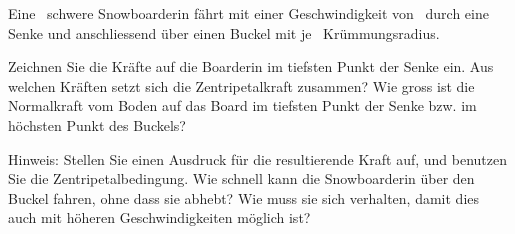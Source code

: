 Eine \mSbO\ schwere Snowboarderin fährt mit einer Geschwindigkeit von \vSbO\ durch eine Senke und anschliessend über einen Buckel mit je \rSbO\ Krümmungsradius.

\begin{abcliste}
\abc Zeichnen Sie die Kräfte auf die Boarderin im tiefsten Punkt der Senke ein. Aus welchen Kräften setzt sich die Zentripetalkraft zusammen?
\abc Wie gross ist die Normalkraft vom Boden auf das Board im tiefsten Punkt der Senke bzw. im höchsten Punkt des Buckels?

Hinweis: Stellen Sie einen Ausdruck für die resultierende Kraft auf, und benutzen Sie die Zentripetalbedingung.
\abc Wie schnell kann die Snowboarderin über den Buckel fahren, ohne dass sie abhebt? Wie muss sie sich verhalten, damit dies auch mit höheren Geschwindigkeiten möglich ist?
\end{abcliste}
